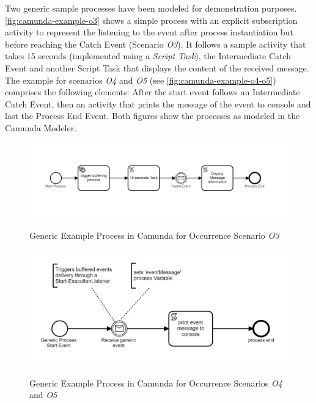 Two generic sample processes have been modeled for demonstration purposes. \autoref{fig:camunda-example-o3} shows a simple process with an explicit subscription activity to represent the listening to the event after process instantiation but before reaching the Catch Event (Scenario \textit{O3}). It follows a sample activity that takes 15 seconds (implemented using a \textit{Script Task}), the Intermediate Catch Event and another Script Task that displays the content of the received message.
The example for scenarios \textit{O4} and \textit{O5} (see \autoref{fig:camunda-example-o4-o5}) comprises the following elements: After the start event follows an Intermediate Catch Event, then an activity that prints the message of the event to console and last the Process End Event. Both figures show the processes as modeled in the Camunda Modeler.

\begin{figure}[]
	\myfloatalign
	{\includegraphics[width=1\linewidth]{chapters/assessment/example-o3.PNG}}
	\caption{Generic Example Process in Camunda for Occurrence Scenario \textit{O3}}\label{fig:camunda-example-o3}
\end{figure}

\begin{figure}[]
	\myfloatalign
	{\includegraphics[width=1\linewidth]{chapters/assessment/example-o4-o5.PNG}}
	\caption{Generic Example Process in Camunda for Occurrence Scenarios \textit{O4} and \textit{O5}}\label{fig:camunda-example-o4-o5}
\end{figure}

